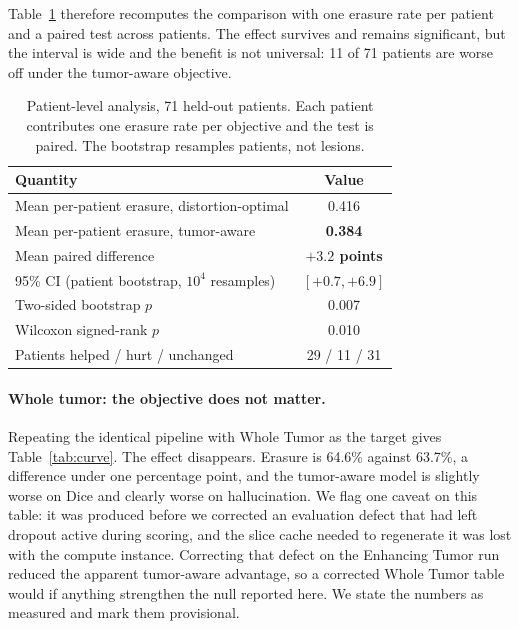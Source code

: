 \documentclass[11pt,a4paper]{article}
\begin{document}
Table~\ref{tab:patient} therefore recomputes the comparison with one erasure rate per patient and a paired test across patients. The effect survives and remains significant, but the interval is wide and the benefit is not universal: 11 of 71 patients are worse off under the tumor-aware objective.

\begin{table}[h]
  \caption{Patient-level analysis, 71 held-out patients. Each patient contributes one erasure rate per objective and the test is paired. The bootstrap resamples patients, not lesions.}
  \label{tab:patient}
  \centering
  \renewcommand{\arraystretch}{1.15}
  \begin{tabular}{@{}lc@{}}
    \toprule
    \textbf{Quantity} & \textbf{Value} \\
    \midrule
    Mean per-patient erasure, distortion-optimal & 0.416 \\
    Mean per-patient erasure, tumor-aware        & \textbf{0.384} \\
    Mean paired difference                       & \textbf{$+3.2$ points} \\
    95\% CI (patient bootstrap, $10^4$ resamples)& $[+0.7, +6.9]$ \\
    Two-sided bootstrap $p$                      & 0.007 \\
    Wilcoxon signed-rank $p$                     & 0.010 \\
    Patients helped / hurt / unchanged           & 29 / 11 / 31 \\
    \bottomrule
  \end{tabular}
\end{table}

\paragraph{Whole tumor: the objective does not matter.}
Repeating the identical pipeline with Whole Tumor as the target gives Table~\ref{tab:curve}. The effect disappears. Erasure is 64.6\% against 63.7\%, a difference under one percentage point, and the tumor-aware model is slightly worse on Dice and clearly worse on hallucination. We flag one caveat on this table: it was produced before we corrected an evaluation defect that had left dropout active during scoring, and the slice cache needed to regenerate it was lost with the compute instance. Correcting that defect on the Enhancing Tumor run reduced the apparent tumor-aware advantage, so a corrected Whole Tumor table would if anything strengthen the null reported here. We state the numbers as measured and mark them provisional.
\end{document}

